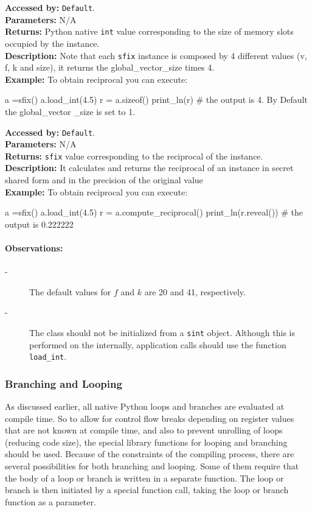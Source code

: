 		
			\textbf{Accessed by:} \verb|Default|.		 \\
			\textbf{Parameters:} N/A \\
			\textbf{Returns:}
				 Python native \verb|int| value corresponding to the size of memory slots occupied by the instance. \\
			\textbf{Description:}
				Note that each \verb|sfix| instance is composed by 4 different values (v, f, k and size), it returns the global_vector_size times 4. \\
	     	\textbf{Example:}
    		    To obtain reciprocal you can execute:
		     	\begin{mylisting}
				a =sfix()
				a.load_int(4.5)
				r = a.sizeof()
				print_ln(r)  # the output is 4. By Default the global_vector
				_size is set to 1.    	
     			\end{mylisting}	 
			\textbf{Accessed by:} \verb|Default|.		 \\
			\textbf{Parameters:} N/A \\
			\textbf{Returns:} \verb|sfix| value corresponding to the reciprocal of the instance. \\
			\textbf{Description:}
				It calculates and returns the reciprocal of an instance in secret shared form and in the precision of the original value \\
	     	\textbf{Example:}
    		    To obtain reciprocal you can execute:
		     	\begin{mylisting}
				a =sfix()
				a.load_int(4.5)
				r = a.compute_reciprocal()
				print_ln(r.reveal())  # the output is 0.222222   	
     			\end{mylisting}	 
	\paragraph{Observations:}
	\begin{description}
	\item[-] The default values for $f$ and $k$ are 20 and 41, respectively.
	\item[-] The class should not be initialized from a \verb|sint| object. 
Although this is performed on the internally, application calls should use the function \verb|load_int|.
	\end{description}
	
\subsubsection{Branching and Looping}
As discussed earlier, all native Python loops and branches are evaluated at
compile time. So to allow for control flow breaks depending on register values
that are not known at compile time, and also to prevent unrolling of loops
(reducing code size), the special
library functions for looping and branching should be used.
Because of the constraints of the compiling process, there are several
possibilities for both branching and looping.
Some of them require that the body of a loop or branch is written
in a separate function. The loop or branch is then initiated by a special
function call, taking the loop or branch function as a parameter.

